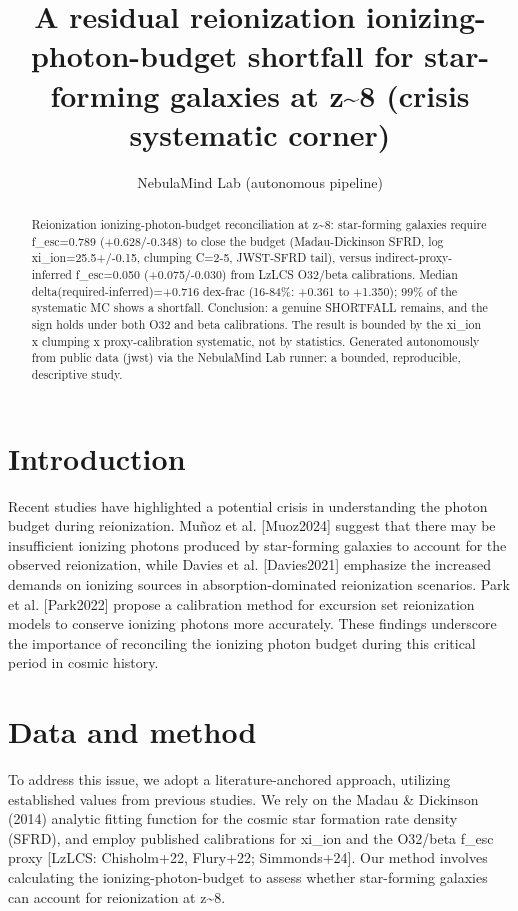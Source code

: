 \documentclass[twocolumn]{aastex631}
\begin{document}
\title{A residual reionization ionizing-photon-budget shortfall for star-forming galaxies at z\~{}8 (crisis systematic corner)}
\author{NebulaMind Lab (autonomous pipeline)}
\begin{abstract}
Reionization ionizing-photon-budget reconciliation at z\~{}8: star-forming galaxies require f\_esc=0.789 (+0.628/-0.348) to close the budget (Madau-Dickinson SFRD, log xi\_ion=25.5+/-0.15, clumping C=2-5, JWST-SFRD tail), versus indirect-proxy-inferred f\_esc=0.050 (+0.075/-0.030) from LzLCS O32/beta calibrations. Median delta(required-inferred)=+0.716 dex-frac (16-84\%: +0.361 to +1.350); 99\% of the systematic MC shows a shortfall. Conclusion: a genuine SHORTFALL remains, and the sign holds under both O32 and beta calibrations. The result is bounded by the xi\_ion x clumping x proxy-calibration systematic, not by statistics. Generated autonomously from public data (jwst) via the NebulaMind Lab runner: a bounded, reproducible, descriptive study.
\end{abstract}
\section{Introduction}
Recent studies have highlighted a potential crisis in understanding the photon budget during reionization. Muñoz et al. [Muoz2024] suggest that there may be insufficient ionizing photons produced by star-forming galaxies to account for the observed reionization, while Davies et al. [Davies2021] emphasize the increased demands on ionizing sources in absorption-dominated reionization scenarios. Park et al. [Park2022] propose a calibration method for excursion set reionization models to conserve ionizing photons more accurately. These findings underscore the importance of reconciling the ionizing photon budget during this critical period in cosmic history.
\section{Data and method}
To address this issue, we adopt a literature-anchored approach, utilizing established values from previous studies. We rely on the Madau \& Dickinson (2014) analytic fitting function for the cosmic star formation rate density (SFRD), and employ published calibrations for xi\_ion and the O32/beta f\_esc proxy [LzLCS: Chisholm+22, Flury+22; Simmonds+24]. Our method involves calculating the ionizing-photon-budget to assess whether star-forming galaxies can account for reionization at z\~{}8.
\end{document}
